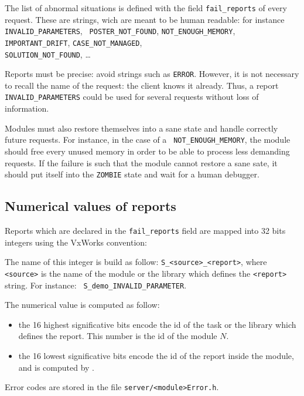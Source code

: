 The list of abnormal situations is defined with the field {\tt fail\_reports}
of every   request.  These   are strings,   wich are   meant to be  human
readable:       for      instance  {\tt      INVALID\_PARAMETERS},   {\tt
POSTER\_NOT\_FOUND}, {\tt NOT\_ENOUGH\_MEMORY},   {\tt IMPORTANT\_DRIFT},
{\tt CASE\_NOT\_MANAGED},\\ {\tt SOLUTION\_NOT\_FOUND}, \ldots

Reports must be precise:  avoid strings such  as {\tt ERROR}. However, it
is not necessary to recall the name  of the request:  the client knows it
already.  Thus, a  report {\tt  INVALID\_PARAMETERS}   could be used  for
several requests without loss of information.

Modules must  also   restore  themselves into  a  sane  state  and handle
correctly future   requests.   For  instance, in  the   case  of  a  {\tt
NOT\_ENOUGH\_MEMORY}, the module should free every unused memory in order
to be able to process  less demanding requests.  If  the failure is  such
that the module cannot restore a sane sate, it should put itself into the
{\tt ZOMBIE} state and wait for a human debugger.


\subsection{Numerical values of reports}

Reports which  are declared in the {\tt  fail\_reports} field are mapped into
32 bits integers using the VxWorks convention:

The name of this integer is build as follow: {\tt S\_<source>\_<report>},
where {\tt <source>} is the name of the module or the library which defines
the      {\tt       <report>}     string.    For       instance:     {\tt
S\_demo\_INVALID\_PARAMETER}.

The numerical value is computed as follow:
\begin{itemize}
\item the 16 highest significative bits encode the id of the task or
the  library which  defines the report.   This  number is  the  id of the
module  $N$.

\item the 16 lowest significative bits encode the id of the report
inside the module, and is computed by \GenoM.
\end{itemize}

Error codes are stored in the file {\tt server/<module>Error.h}.



